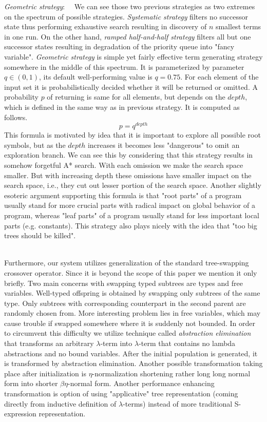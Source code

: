 \documentclass[conference]{IEEEtran}
\newcommand{\lterm}{$\lambda$-term\xspace}
\newcommand{\lterms}{$\lambda$-terms\xspace}
\begin{document}
\textit{Geometric strategy}:~~
We can see those two previous strategies as two extremes on the spectrum of 
possible strategies. 
\textit{Systematic strategy} filters no successor state thus performing
exhaustive search resulting in discovery of $n$ smallest terms in one run.
On the other hand, \textit{ramped half-and-half strategy} filters 
all but one successor states resulting in degradation of 
the priority queue into "fancy variable".
\textit{Geometric strategy} is simple yet fairly effective term generating 
strategy somewhere in the middle of this spectrum.
It is parameterized by parameter $q \in (0,1)$, its default well-performing 
value is $q = 0.75$.
For each element of the input set 
it is probabilistically decided whether
it will be returned or omitted. A probability $p$ of returning is
same for all elements, but depends on the $depth$, 
which is defined in the same way as in previous strategy. 
It is computed as follows.
$$ p = q^{depth} $$
This formula is motivated by idea that it is important to
explore all possible root symbols, but as the $depth$ 
increases it becomes less "dangerous" to omit 
an exploration branch. 
We can see this by considering that this strategy results in
somehow forgetful A* search.
With each omission we make the search space smaller. But with
increasing depth these omissions have smaller impact on the search space,
i.e., they cut out lesser portion of the search space.
Another slightly esoteric argument supporting this formula is that "root 
parts" of a program usually stand for more crucial parts
with radical impact on global behavior of a program, 
whereas "leaf parts" of a program usually
stand for less important local parts (e.g. constants).  
This strategy also plays nicely with the idea that 
"too big trees should be killed".

~\\
Furthermore, our system utilizes generalization of the standard 
tree-swapping crossover operator. Since it is beyond the scope of this 
paper we mention it only briefly. Two main concerns with swapping typed 
subtrees are types and free variables. Well-typed offspring is obtained 
by swapping only subtrees of the same type. Only subtrees with 
corresponding counterpart in the second parent are randomly chosen from.
More interesting problem lies in free variables, which may cause trouble
if swapped somewhere where it is suddenly not bounded. In order to circumvent this
difficulty we utilize technique called \textit{abstraction elimination}\cite{jones87}
that transforms an arbitrary \lterm into \lterm that contains no lambda abstractions
and no bound variables. After the initial population is generated,  it is transformed
by abstraction elimination. Another possible transformation taking place
after initialization is $\eta$-normalization shortening 
rather long long normal form into shorter $\beta\eta$-normal form.  
Another performance enhancing transformation is option of using "applicative" tree representation (coming directly from inductive definition of \lterms) instead of more traditional S-expression representation.
\end{document}
